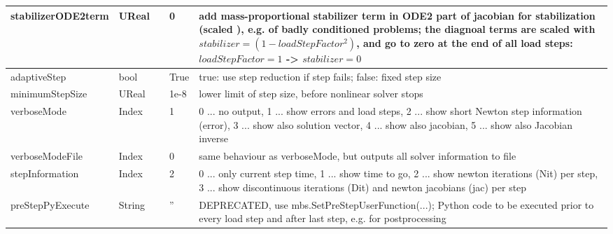 \begin{center}
\begin{longtable}{| p{4.2cm} | p{2.5cm} | p{0.3cm} | p{3.0cm} | p{6cm} |}
    stabilizerODE2term &     UReal &      &     0 &     add mass-proportional stabilizer term in ODE2 part of jacobian for stabilization (scaled ), e.g. of badly conditioned problems; the diagnoal terms are scaled with $stabilizer = (1-loadStepFactor^2)$, and go to zero at the end of all load steps: $loadStepFactor=1$ -> $stabilizer = 0$\\ \hline
    adaptiveStep &     bool &      &     True &     true: use step reduction if step fails; false: fixed step size\\ \hline
    minimumStepSize &     UReal &      &     1e-8 &     lower limit of step size, before nonlinear solver stops\\ \hline
    verboseMode &     Index &      &     1 &     0 ... no output, 1 ... show errors and load steps, 2 ... show short Newton step information (error), 3 ... show also solution vector, 4 ... show also jacobian, 5 ... show also Jacobian inverse\\ \hline
    verboseModeFile &     Index &      &     0 &     same behaviour as verboseMode, but outputs all solver information to file\\ \hline
    stepInformation &     Index &      &     2 &     0 ... only current step time, 1 ... show time to go, 2 ... show newton iterations (Nit) per step, 3 ... show discontinuous iterations (Dit) and newton jacobians (jac) per step\\ \hline
    preStepPyExecute &     String &      &     '' &     DEPRECATED, use mbs.SetPreStepUserFunction(...); Python code to be executed prior to every load step and after last step, e.g. for postprocessing\\ \hline
	  \end{longtable}
	\end{center}

